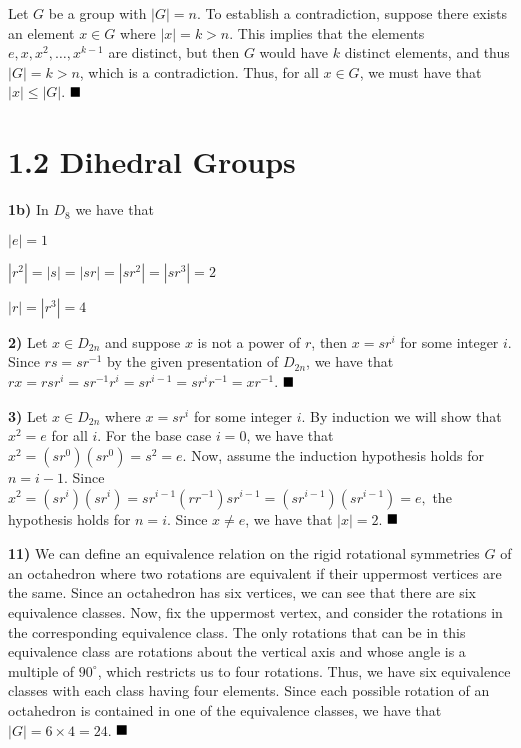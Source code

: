 \documentclass[12pt]{article}
\newcommand{\vertb}[1]{\left\vert#1\right\vert}
\newcommand{\done}{\ensuremath{\strut\hfill\blacksquare}}
\begin{document}
Let \( G \) be a group with \( \vertb{G} = n \).
To establish a contradiction, suppose there exists an element \( x \in G \)
where \( \vertb{x} = k > n \).
This implies that the elements \( e, x, x^2, \dots, x^{k - 1} \) are distinct,
but then \( G \) would have \( k \) distinct elements, and thus
\( \vertb{G} = k > n \), which is a contradiction.
Thus, for all \( x \in G \), we must have that \( \vertb{x} \leq \vertb{G} \).
\done

\section*{1.2 Dihedral Groups}

\textbf{1b)}
In \( D_8 \) we have that

\(
	\vertb{e} = 1
\)

\(
	\vertb{r^2}
	= \vertb{s}
	= \vertb{sr}
	= \vertb{sr^2}
	= \vertb{sr^3}
	= 2
\)

\(
	\vertb{r}
	= \vertb{r^3}
	= 4
\)

\textbf{2)}
Let \( x \in D_{2n} \) and suppose \( x \) is not a power of \( r \), then
\( x = sr^{i} \) for some integer \( i \).
Since \( rs = sr^{-1} \) by the given presentation of \( D_{2n} \), we have
that \( rx = rsr^i = sr^{-1}r^i = sr^{i - 1} = sr^ir^{-1} = xr^{-1} \).
\done

\textbf{3)}
Let \( x \in D_{2n} \) where \( x = sr^{i} \) for some integer \( i \).
By induction we will show that \( x^2 = e \) for all \( i \).
For the base case \( i = 0 \), we have that \( x^2 = (sr^0)(sr^0) = s^2 = e \).
Now, assume the induction hypothesis holds for \( n = i - 1 \).
Since
\(
	x^2
	= (sr^i)(sr^i)
	= sr^{i - 1}(rr^{-1})sr^{i - 1}
	= (sr^{i - 1})(sr^{i - 1})
	= e,
\)
the hypothesis holds for \( n = i \).
Since \( x \ne e \), we have that \( \vertb{x} = 2 \).
\done

\textbf{11)} We can define an equivalence relation on the rigid rotational
symmetries \( G \) of an octahedron where two rotations are equivalent if their
uppermost vertices are the same.
Since an octahedron has six vertices, we can see that there are six equivalence
classes.
Now, fix the uppermost vertex, and consider the rotations in the corresponding
equivalence class.
The only rotations that can be in this equivalence class are rotations about
the vertical axis and whose angle is a multiple of \( 90^\circ \), which
restricts us to four rotations.
Thus, we have six equivalence classes with each class having four elements.
Since each possible rotation of an octahedron is contained in one of the
equivalence classes, we have that \( \vertb{G} = 6 \times 4 = 24 \).
\done
\end{document}
